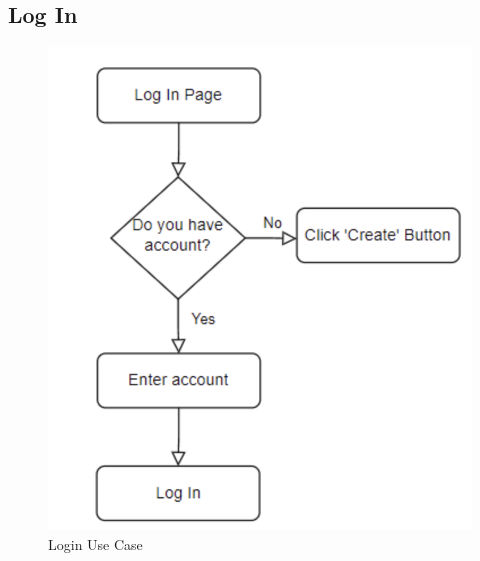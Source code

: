 \documentclass[conference]{IEEEtran}
\begin{document}
\subsection{Log In}
\begin{figure}[h]
    \includegraphics[width=\columnwidth]{Resources/login.png} 
    \caption{Login Use Case}
    \label{fig:login}
\end{figure}
\end{document}

